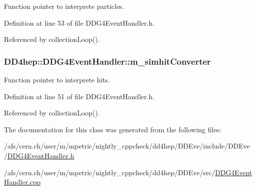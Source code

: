 Function pointer to interprete particles. 

Definition at line 53 of file DDG4EventHandler.h.

Referenced by collectionLoop().\hypertarget{class_d_d4hep_1_1_d_d_g4_event_handler_a608844b86789ef2ccc8b7d088bdb7fe6}{
\subsubsection[{m\_\-simhitConverter}]{ {\bf DD4hep::DDG4EventHandler::m\_\-simhitConverter}}}
\label{class_d_d4hep_1_1_d_d_g4_event_handler_a608844b86789ef2ccc8b7d088bdb7fe6}


Function pointer to interprete hits. 

Definition at line 51 of file DDG4EventHandler.h.

Referenced by collectionLoop().

The documentation for this class was generated from the following files:\begin{DoxyCompactItemize}
\item 
/afs/cern.ch/user/m/mpetric/nightly\_\-cppcheck/dd4hep/DDEve/include/DDEve/\hyperlink{_d_d_g4_event_handler_8h}{DDG4EventHandler.h}\item 
/afs/cern.ch/user/m/mpetric/nightly\_\-cppcheck/dd4hep/DDEve/src/\hyperlink{_d_d_g4_event_handler_8cpp}{DDG4EventHandler.cpp}\end{DoxyCompactItemize}
